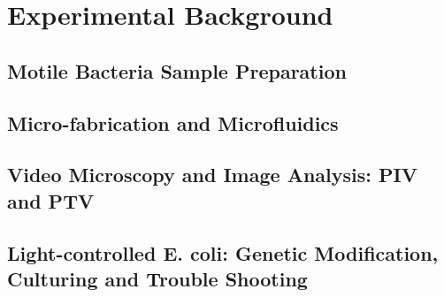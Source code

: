 

\chapter{Experimental Background}
\label{experimental-background}


\section{Motile Bacteria Sample Preparation}
\label{motile-bacteria-sample-preparation}


\section{Micro-fabrication and Microfluidics}
\label{micro-fabrication-and-microfluidics}

\section{Video Microscopy and Image Analysis: PIV and PTV}
\label{video-microscopy-and-image-analysis-PIV-and-PTV}

\section{Light-controlled E. coli: Genetic Modification, Culturing and Trouble Shooting}
\label{light-controlled-E-coli-genetic-modification-culturing-and-trouble-shooting}

